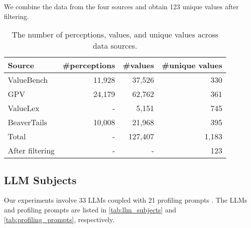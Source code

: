 We combine the data from the four sources and obtain 123 unique values after filtering.




\begin{table}[ht]
    \centering
    \begin{tabular}{lrrr}
    \toprule
    Source & \#perceptions & \#values & \#unique values \\ \midrule
    ValueBench & 11,928 & 37,526 & 330 \\
    GPV & 24,179 & 62,762 & 361 \\
    ValueLex & - & 5,151 & 745 \\
    BeaverTails & 10,008 & 21,968 & 395 \\ \midrule
    Total & - & 127,407 & 1,183 \\
    After filtering & - & - & 123 \\ \bottomrule
    \end{tabular}
    \caption{The number of perceptions, values, and unique values across data sources.}
    \label{tab:summary}
    \end{table}

\subsection{LLM Subjects}\label{app:llm_subjects}

Our experiments involve 33 LLMs coupled with 21 profiling prompts \cite{rozen2024llms}. The LLMs and profiling prompts are listed in \cref{tab:llm_subjects} and \cref{tab:profiling_prompts}, respectively.

